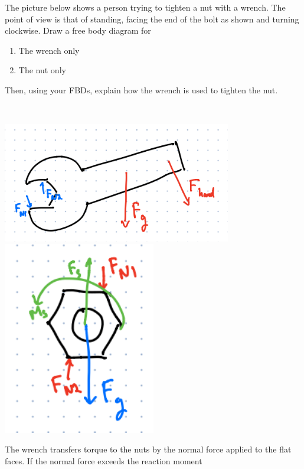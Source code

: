 The picture below shows a person trying to tighten a nut with a wrench. The point of view is that of standing, facing the end of the bolt as shown and turning clockwise. Draw a free body diagram for
\begin{enumerate}
    \item The wrench only
    \item The nut only
\end{enumerate}

Then, using your FBDs, explain how the wrench is used to tighten the nut.

\begin{solution}\
\begin{center}
    \includegraphics[width=0.75\textwidth]{img/e14p1.png}
    \includegraphics[width=0.5\textwidth]{img/e14p2.png}
\end{center}

The wrench transfers torque to the nuts by the normal force applied to the flat faces. If the normal force exceeds the reaction moment
\end{solution}